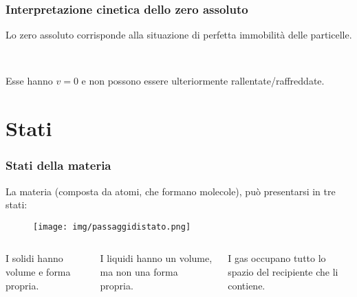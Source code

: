 \documentclass[]{beamer}
\theoremstyle{plain}
\begin{document}
\begin{frame}
\frametitle{Interpretazione cinetica dello zero assoluto}
Lo zero assoluto corrisponde alla situazione di \alert<1>{perfetta immobilità delle particelle}.\pause

~

Esse hanno $ v = 0 $ e \alert{non possono essere ulteriormente rallentate/raffreddate}.


\begin{figure}\centering
{}
\end{figure}
\end{frame}



\section{Stati}



\begin{frame}
\frametitle{Stati della materia}
La materia (composta da atomi, che formano molecole), può presentarsi in tre stati:
\begin{figure}
\texttt{[image: img/passaggidistato.png]}
\end{figure}
\begin{columns}
\begin{column}{0.3\textwidth}
\begin{center}
I solidi hanno volume e forma propria.\\~
\end{center}
\end{column}
\begin{column}{0.3\textwidth}
\begin{center}
I liquidi hanno un volume, ma non una forma propria.\\~
\end{center}
\end{column}
\begin{column}{0.3\textwidth}
\begin{center}
I gas occupano tutto lo spazio del recipiente che li contiene.
\end{center}
\end{column}
\end{columns}
\end{frame}
\end{document}
